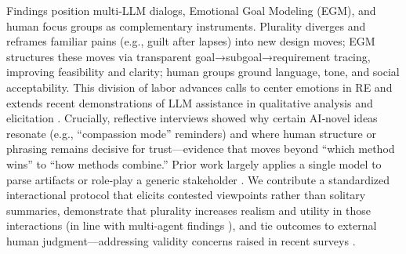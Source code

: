 \documentclass[acmsmall]{acmart}
\begin{document}
Findings position multi‑LLM dialogs, Emotional Goal Modeling (EGM), and human focus groups as complementary instruments. Plurality diverges and reframes familiar pains (e.g., guilt after lapses) into new design moves; EGM structures these moves via transparent goal→subgoal→requirement tracing, improving feasibility and clarity; human groups ground language, tone, and social acceptability. This division of labor advances calls to center emotions in RE \cite{miller2015emotion,curumsing2014designing,hadiana2020emotional} and extends recent demonstrations of LLM assistance in qualitative analysis and elicitation \cite{bano2024large,bano2023ai,hayes2025conversing}. Crucially, reflective interviews showed why certain AI‑novel ideas resonate (e.g., “compassion mode” reminders) and where human structure or phrasing remains decisive for trust—evidence that moves beyond “which method wins” to “how methods combine.” Prior work largely applies a single model to parse artifacts or role‑play a generic stakeholder \cite{barros2025large,marques2024using,khan2025large}. We contribute a standardized interactional protocol that elicits contested viewpoints rather than solitary summaries, demonstrate that plurality increases realism and utility in those interactions (in line with multi‑agent findings \cite{park2023generative,hulman2023chatgpt}), and tie outcomes to external human judgment—addressing validity concerns raised in recent surveys \cite{bano2023ai}.
\end{document}
